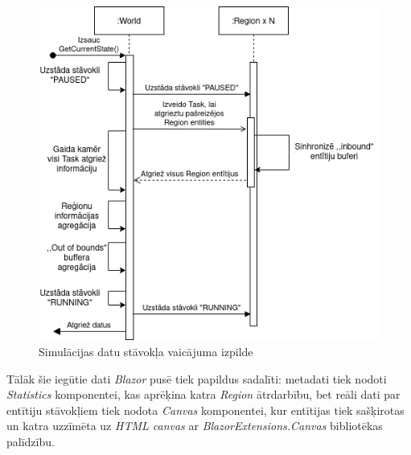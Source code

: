 \begin{figure}[H]
	\centering
	\includegraphics[scale=0.7]{images/DiseaseCore-GetData.png}
	\caption{Simulācijas datu stāvokļa vaicājuma izpilde}
	\label{img:squance-diagram-get-status}
\end{figure}

Tālāk šie iegūtie dati \emph{Blazor} pusē tiek papildus sadalīti: metadati tiek nodoti
\emph{Statistics} komponentei, kas aprēķina katra \emph{Region} ātrdarbību, bet
reāli dati par entītiju stāvokļiem tiek nodota \emph{Canvas} komponentei, kur
entītijas tiek sašķirotas un katra uzzīmēta uz \emph{HTML canvas} ar \emph{BlazorExtensions.Canvas} bibliotēkas palīdzību.
